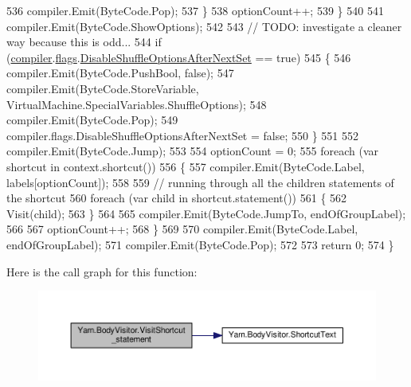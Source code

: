 \begin{DoxyCode}
536                     compiler.Emit(ByteCode.Pop);
537                 \}
538                 optionCount++;
539             \}
540 
541             compiler.Emit(ByteCode.ShowOptions);
542 
543             \textcolor{comment}{// TODO: investigate a cleaner way because this is odd...}
544             \textcolor{keywordflow}{if} (\hyperlink{a00038_a39d71c6de5e1c9f7d2f78ac2ccd5743d}{compiler}.\hyperlink{a00032_aeba873449ff9fb1c6d731ff7eb25f0a0}{flags}.\hyperlink{a00032_ae27568d71aa82edfd7841d425969a4fb}{DisableShuffleOptionsAfterNextSet}
       == \textcolor{keyword}{true})
545             \{
546                 compiler.Emit(ByteCode.PushBool, \textcolor{keyword}{false});
547                 compiler.Emit(ByteCode.StoreVariable, VirtualMachine.SpecialVariables.ShuffleOptions);
548                 compiler.Emit(ByteCode.Pop);
549                 compiler.flags.DisableShuffleOptionsAfterNextSet = \textcolor{keyword}{false};
550             \}
551 
552             compiler.Emit(ByteCode.Jump);
553 
554             optionCount = 0;
555             \textcolor{keywordflow}{foreach} (var shortcut \textcolor{keywordflow}{in} context.shortcut())
556             \{
557                 compiler.Emit(ByteCode.Label, labels[optionCount]);
558 
559                 \textcolor{comment}{// running through all the children statements of the shortcut}
560                 \textcolor{keywordflow}{foreach} (var child \textcolor{keywordflow}{in} shortcut.statement())
561                 \{
562                     Visit(child);
563                 \}
564 
565                 compiler.Emit(ByteCode.JumpTo, endOfGroupLabel);
566 
567                 optionCount++;
568             \}
569 
570             compiler.Emit(ByteCode.Label, endOfGroupLabel);
571             compiler.Emit(ByteCode.Pop);
572 
573             \textcolor{keywordflow}{return} 0;
574         \}
\end{DoxyCode}


Here is the call graph for this function\-:
\nopagebreak
\begin{figure}[H]
\begin{center}
\leavevmode
\includegraphics[width=350pt]{a00038_ad1576a22d74304c3155a0c2fa91be5b9_cgraph}
\end{center}
\end{figure}


